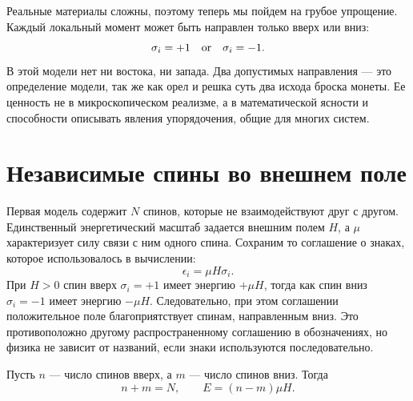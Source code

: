 Реальные материалы сложны, поэтому теперь мы пойдем на грубое упрощение. Каждый локальный
момент может быть направлен только вверх или вниз:
\begin{equation}
 \sigma_i=+1\quad\hbox{or}\quad\sigma_i=-1.
 \label{eq:sm8-ising-spin}
\end{equation}
В этой модели нет ни востока, ни запада. Два допустимых направления — это
определение модели, так же как орел и решка суть два исхода броска монеты.
Ее ценность не в микроскопическом реализме, а в математической ясности и способности
описывать явления упорядочения, общие для многих систем.

\begin{classroomqa}
\end{classroomqa}

\section{Независимые спины во внешнем поле}

Первая модель содержит \(N\) спинов, которые не взаимодействуют друг с другом.
Единственный энергетический масштаб задается внешним полем \(H\), а \(\mu\) характеризует
силу связи с ним одного спина. Сохраним то соглашение о знаках, которое использовалось
в вычислении:
\begin{equation}
 \epsilon_i=\mu H\sigma_i.
 \label{eq:sm8-single-spin-energy}
\end{equation}
При \(H>0\) спин вверх \(\sigma_i=+1\) имеет энергию \(+\mu H\), тогда как спин
вниз \(\sigma_i=-1\) имеет энергию \(-\mu H\). Следовательно, при этом соглашении
положительное поле благоприятствует спинам, направленным вниз. Это противоположно другому распространенному
соглашению в обозначениях, но физика не зависит от названий, если знаки используются
последовательно.

Пусть \(n\) — число спинов вверх, а \(m\) — число спинов вниз. Тогда
\begin{equation}
 n+m=N,
 \qquad
 E=(n-m)\mu H.
 \label{eq:sm8-counting-energy}
\end{equation}

